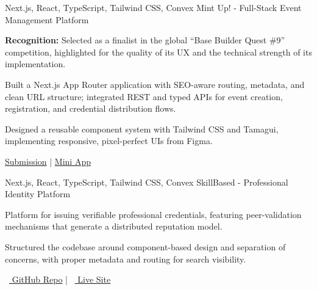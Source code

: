 

\begin{cventries}

  \cventry
    {Next.js, React, TypeScript, Tailwind CSS, Convex} %
    {Mint Up! - Full-Stack Event Management Platform} %
    {} %
    {} %
    {
      \begin{cvitems} %
        \item {\textbf{Recognition:} Selected as a finalist in the global \textquotedblleft Base Builder Quest \#9\textquotedblright{} competition, highlighted for the quality of its UX and the technical strength of its implementation.}
        \item {Built a Next.js App Router application with SEO-aware routing, metadata, and clean URL structure; integrated REST and typed APIs for event creation, registration, and credential distribution flows.}
        \item {Designed a reusable component system with Tailwind CSS and Tamagui, implementing responsive, pixel-perfect UIs from Figma.}
        \item {\faLink \href{https://devfolio.co/projects/mint-up-5d5d}{ Submission} \quad | \quad \faLink \href{https://farcaster.xyz/miniapps/jkuOonikCzn7/mint-up}{ Mini App}}
      \end{cvitems}
    }

  \vspace{6mm}

  \cventry
    {Next.js, React, TypeScript, Tailwind CSS, Convex} %
    {SkillBased - Professional Identity Platform} %
    {} %
    {} %
    {
      \begin{cvitems} %
        \item {Platform for issuing verifiable professional credentials, featuring peer-validation mechanisms that generate a distributed reputation model.}
        \item {Structured the codebase around component-based design and separation of concerns, with proper metadata and routing for search visibility.}
        \item {\faGithub\ \href{https://github.com/mavix21/SkillBased}{ GitHub Repo} \quad | \quad \faLink\ \href{https://skill-based.vercel.app/}{ Live Site}}
      \end{cvitems}
    }


\end{cventries}
